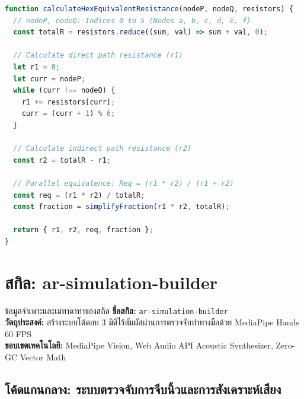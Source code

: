 \begin{lstlisting}[language=JavaScript, caption={Hexagonal Circuit Reduction Algorithm}]
function calculateHexEquivalentResistance(nodeP, nodeQ, resistors) {
  // nodeP, nodeQ: Indices 0 to 5 (Nodes a, b, c, d, e, f)
  const totalR = resistors.reduce((sum, val) => sum + val, 0);
  
  // Calculate direct path resistance (r1)
  let r1 = 0;
  let curr = nodeP;
  while (curr !== nodeQ) {
    r1 += resistors[curr];
    curr = (curr + 1) % 6;
  }
  
  // Calculate indirect path resistance (r2)
  const r2 = totalR - r1;
  
  // Parallel equivalence: Req = (r1 * r2) / (r1 + r2)
  const req = (r1 * r2) / totalR;
  const fraction = simplifyFraction(r1 * r2, totalR);
  
  return { r1, r2, req, fraction };
}
\end{lstlisting}

\section{สกิล: ar-simulation-builder}

\begin{teachingplan}{ข้อมูลจำเพาะและเมทาดาทาของสกิล}
\textbf{ชื่อสกิล:} \texttt{ar-simulation-builder}\\
\textbf{วัตถุประสงค์:} สร้างระบบโต้ตอบ 3 มิติไร้สัมผัสผ่านการตรวจจับท่าทางมือด้วย MediaPipe Hands 60 FPS\\
\textbf{ขอบเขตเทคโนโลยี:} MediaPipe Vision, Web Audio API Acoustic Synthesizer, Zero-GC Vector Math
\end{teachingplan}

\subsection{โค้ดแกนกลาง: ระบบตรวจจับการจีบนิ้วและการสังเคราะห์เสียง}


